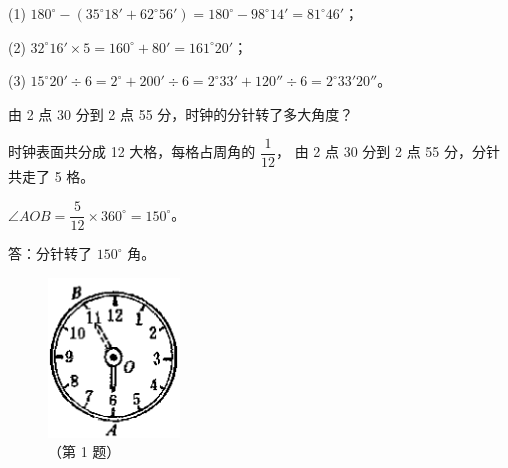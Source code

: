 \jie (1) $180^\circ - (35^\circ 18' + 62^\circ 56') = 180^\circ - 98^\circ 14' = 81^\circ 46'$；

(2) $32^\circ 16' \times 5 = 160^\circ + 80' = 161^\circ 20'$；

(3) $15^\circ 20' \div 6 = 2^\circ + 200' \div 6 = 2^\circ 33' + 120'' \div 6 = 2^\circ 33' 20''$。


\begin{enhancedline}
\liti 由 2 点 30 分到  2 点 55 分，时钟的分针转了多大角度？

\jie 时钟表面共分成 12 大格，每格占周角的 $\dfrac{1}{12}$， 由 2 点 30 分到 2 点 55 分，分针共走了 5 格。

$\angle AOB = \dfrac{5}{12} \times 360^\circ = 150^\circ$。

答：分针转了 $150^\circ$ 角。
\end{enhancedline}

\begin{figure}[htbp]
    \centering
    \begin{minipage}[b]{7cm}
        \centering
        \includegraphics[width=3.5cm]{../pic/czjh1-ch1-28.png}
        \caption{}\label{fig:czjh1-1-28}
    \end{minipage}
    \qquad
    \begin{minipage}[b]{7cm}
        \centering
        
        \caption*{（第 1 题）}
    \end{minipage}
\end{figure}

